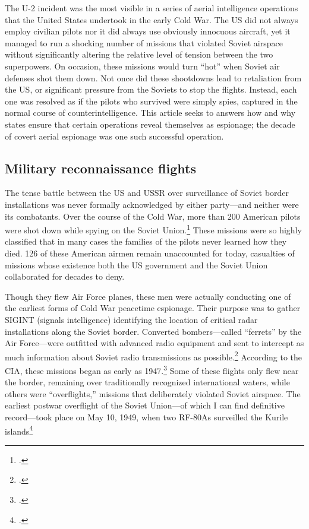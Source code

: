 \documentclass[14pt]{extarticle}
\begin{document}
The U-2 incident was the most visible in a series of aerial intelligence operations that the United States undertook in the early Cold War. The US did not always employ civilian pilots nor it did always use obviously innocuous aircraft, yet it managed to run a shocking number of missions that violated Soviet airspace without significantly altering the relative level of tension between the two superpowers. On occasion, these missions would turn \enquote{hot} when Soviet air defenses shot them down. Not once did these shootdowns lead to retaliation from the US, or significant pressure from the Soviets to stop the flights. Instead, each one was resolved as if the pilots who survived were simply spies, captured in the normal course of counterintelligence. This article seeks to answers how and why states ensure that certain operations reveal themselves as espionage; the decade of covert aerial espionage was one such successful operation.

\subsection{Military reconnaissance flights}
The tense battle between the US and USSR over surveillance of Soviet border installations was never formally acknowledged by either party---and neither were its combatants. Over the course of the Cold War, more than 200 American pilots were shot down while spying on the Soviet Union.\footcite{glenshaw_secret_2017} These missions were so highly classified that in many cases the families of the pilots never learned how they died. 126 of these American airmen remain unaccounted for today, casualties of missions whose existence both the US government and the Soviet Union collaborated for decades to deny.

Though they flew Air Force planes, these men were actually conducting one of the earliest forms of Cold War peacetime espionage. Their purpose was to gather SIGINT (signals intelligence) identifying the location of critical radar installations along the Soviet border. Converted bombers---called \enquote{ferrets} by the Air Force---were outfitted with advanced radio equipment and sent to intercept as much information about Soviet radio transmissions as possible.\footcite[p.~4]{peterson_maybe_1993} According to the CIA, these missions began as early as 1947.\footcite[p.~4]{peterson_maybe_1993} Some of these flights only flew near the border, remaining over traditionally recognized international waters, while others were \enquote{overflights,} missions that deliberately violated Soviet airspace. The earliest postwar overflight of the Soviet Union---of which I can find definitive record---took place on May 10, 1949, when two RF-80As surveilled the Kurile islands\footcite[p.~8]{peebles_shadow_2000}
\end{document}
